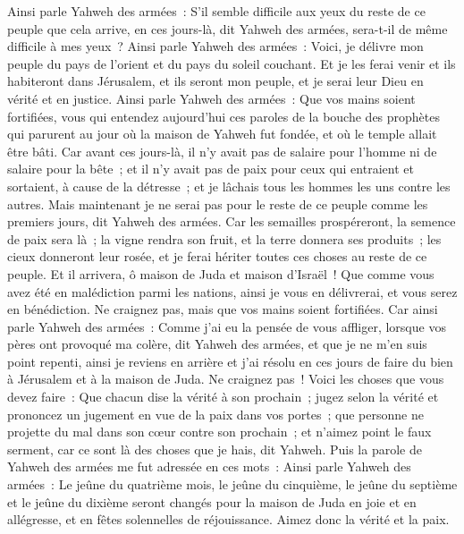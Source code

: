 \begin{multicols}{2}
Ainsi parle Yahweh des armées~: S'il semble difficile aux yeux du reste de ce peuple que cela arrive, en ces jours-là, dit Yahweh des armées, sera-t-il de même difficile à mes yeux~?
Ainsi parle Yahweh des armées~: Voici, je délivre mon peuple du pays de l'orient et du pays du soleil couchant.
Et je les ferai venir et ils habiteront dans Jérusalem, et ils seront mon peuple, et je serai leur Dieu en vérité et en justice.
Ainsi parle Yahweh des armées~: Que vos mains soient fortifiées, vous qui entendez aujourd'hui ces paroles de la bouche des prophètes qui parurent au jour où la maison de Yahweh fut fondée, et où le temple allait être bâti.
Car avant ces jours-là, il n'y avait pas de salaire pour l'homme ni de salaire pour la bête~; et il n'y avait pas de paix pour ceux qui entraient et sortaient, à cause de la détresse~; et je lâchais tous les hommes les uns contre les autres.
Mais maintenant je ne serai pas pour le reste de ce peuple comme les premiers jours, dit Yahweh des armées.
Car les semailles prospéreront, la semence de paix sera là~; la vigne rendra son fruit, et la terre donnera ses produits~; les cieux donneront leur rosée, et je ferai hériter toutes ces choses au reste de ce peuple.
Et il arrivera, ô maison de Juda et maison d'Israël~! Que comme vous avez été en malédiction parmi les nations, ainsi je vous en délivrerai, et vous serez en bénédiction. Ne craignez pas, mais que vos mains soient fortifiées.
Car ainsi parle Yahweh des armées~: Comme j'ai eu la pensée de vous affliger, lorsque vos pères ont provoqué ma colère, dit Yahweh des armées, et que je ne m'en suis point repenti,
ainsi je reviens en arrière et j'ai résolu en ces jours de faire du bien à Jérusalem et à la maison de Juda. Ne craignez pas~!
Voici les choses que vous devez faire~: Que chacun dise la vérité à son prochain~; jugez selon la vérité et prononcez un jugement en vue de la paix dans vos portes~;
que personne ne projette du mal dans son cœur contre son prochain~; et n'aimez point le faux serment, car ce sont là des choses que je hais, dit Yahweh.
Puis la parole de Yahweh des armées me fut adressée en ces mots~:
Ainsi parle Yahweh des armées~: Le jeûne du quatrième mois, le jeûne du cinquième, le jeûne du septième et le jeûne du dixième seront changés pour la maison de Juda en joie et en allégresse, et en fêtes solennelles de réjouissance. Aimez donc la vérité et la paix.

\end{multicols}
